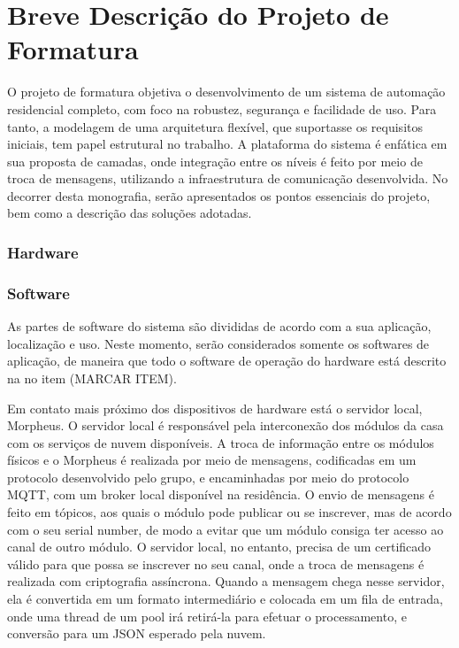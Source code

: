 \chapter{Breve Descrição do Projeto de Formatura}

O projeto de formatura objetiva o desenvolvimento de um sistema de automação residencial completo, com foco na robustez, segurança e facilidade de uso. Para tanto, a modelagem de uma arquitetura flexível, que suportasse os requisitos iniciais, tem papel estrutural no trabalho. A plataforma do sistema é enfática em sua proposta de camadas, onde integração entre os níveis é feito por meio de troca de mensagens, utilizando a infraestrutura de comunicação desenvolvida. No decorrer desta monografia, serão apresentados os pontos essenciais do projeto, bem como a descrição das soluções adotadas.

\subsection{Hardware}

\subsection{Software}

As partes de software do sistema são divididas de acordo com a sua aplicação, localização e uso. Neste momento, serão considerados somente os softwares de aplicação, de maneira que todo o software de operação do hardware está descrito na no item (MARCAR ITEM).

Em contato mais próximo dos dispositivos de hardware está o servidor local, Morpheus. O servidor local é responsável pela interconexão dos módulos da casa com os serviços de nuvem disponíveis. A troca de informação entre os módulos físicos e o Morpheus é realizada por meio de mensagens, codificadas em um protocolo desenvolvido pelo grupo, e encaminhadas por meio do protocolo MQTT, com um broker local disponível na residência. O envio de mensagens é feito em tópicos, aos quais o módulo pode publicar ou se inscrever, mas de acordo com o seu serial number, de modo a evitar que um módulo consiga ter acesso ao canal de outro módulo. O servidor local, no entanto, precisa de um certificado válido para que possa se inscrever no seu canal, onde a troca de mensagens é realizada com criptografia assíncrona. Quando a mensagem chega nesse servidor, ela é convertida em um formato intermediário e colocada em um fila de entrada, onde uma thread de um pool irá retirá-la para efetuar o processamento, e conversão para um JSON esperado pela nuvem.

